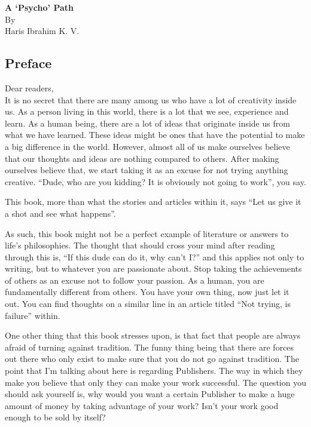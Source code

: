 \documentclass[twoside,11pt,titlepage]{article}
\begin{document}
\thispagestyle{plain}
\bigskip
\bigskip
\bigskip
\bigskip
\begin{center}
  \huge{\textbf{A `Psycho' Path}}\\
  \bigskip
  \Large{By}\\
  \bigskip
  \LARGE{Haris Ibrahim K. V.}
\end{center}

\newpage
\thispagestyle{plain}
\tableofcontents
\newpage
\begin{center}
  \section{Preface}
\end{center}
Dear readers,\\

It is no secret that there are many among us who have a lot of creativity inside us. As a person living in this world, there is a lot that we see, experience and learn. As a human being, there are a lot of ideas that originate inside us from what we have learned. These ideas might be ones that have the potential to make a big difference in the world. However, almost all of us make ourselves believe that our thoughts and ideas are nothing compared to others. After making ourselves believe that, we start taking it as an excuse for not trying anything creative. ``Dude, who are you kidding? It is obviously not going to work'', you say.

This book, more than what the stories and articles within it, says ``Let us give it a shot and see what happens''.

As such, this book might not be a perfect example of literature or answers to life's philosophies. The thought that should cross your mind after reading through this is, ``If this dude can do it, why can't I?'' and this applies not only to writing, but to whatever you are passionate about. Stop taking the achievements of others as an excuse not to follow your passion. As a human, you are fundamentally different from others. You have your own thing, now just let it out. You can find thoughts on a similar line in an article titled ``Not trying, is failure'' within.

One other thing that this book stresses upon, is that fact that people are always afraid of turning against tradition. The funny thing being that there are forces out there who only exist to make sure that you do not go against tradition. The point that I'm talking about here is regarding Publishers. The way in which they make you believe that only they can make your work successful. The question you should ask yourself is, why would you want a certain Publisher to make a huge amount of money by taking advantage of your work? Isn't your work good enough to be sold by itself? 
\end{document}
